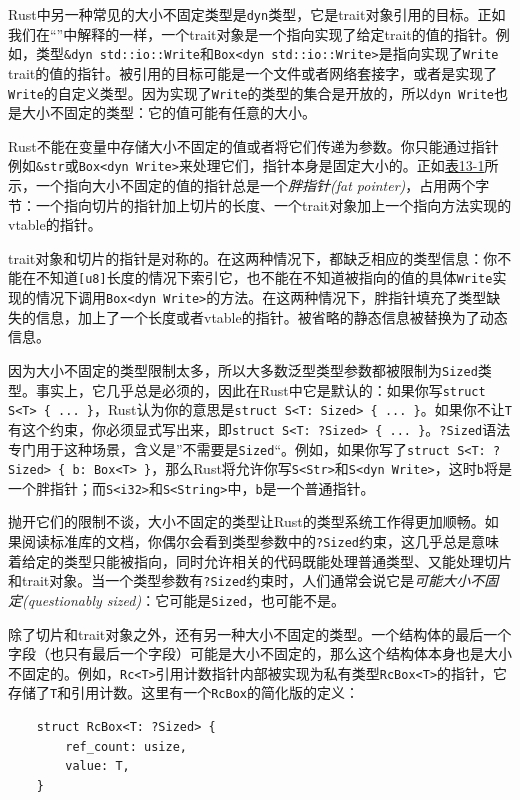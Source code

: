 Rust中另一种常见的大小不固定类型是\texttt{dyn}类型，它是trait对象引用的目标。正如我们在“”中解释的一样，一个trait对象是一个指向实现了给定trait的值的指针。例如，类型\texttt{\&dyn std::io::Write}和\texttt{Box<dyn std::io::Write>}是指向实现了\texttt{Write} trait的值的指针。被引用的目标可能是一个文件或者网络套接字，或者是实现了\texttt{Write}的自定义类型。因为实现了\texttt{Write}的类型的集合是开放的，所以\texttt{dyn Write}也是大小不固定的类型：它的值可能有任意的大小。

Rust不能在变量中存储大小不固定的值或者将它们传递为参数。你只能通过指针例如\texttt{\&str}或\texttt{Box<dyn Write>}来处理它们，指针本身是固定大小的。正如\hyperref[f13-1]{表13-1}所示，一个指向大小不固定的值的指针总是一个\emph{胖指针(fat pointer)}，占用两个字节：一个指向切片的指针加上切片的长度、一个trait对象加上一个指向方法实现的vtable的指针。

trait对象和切片的指针是对称的。在这两种情况下，都缺乏相应的类型信息：你不能在不知道\texttt{[u8]}长度的情况下索引它，也不能在不知道被指向的值的具体\texttt{Write}实现的情况下调用\texttt{Box<dyn Write>}的方法。在这两种情况下，胖指针填充了类型缺失的信息，加上了一个长度或者vtable的指针。被省略的静态信息被替换为了动态信息。

因为大小不固定的类型限制太多，所以大多数泛型类型参数都被限制为\texttt{Sized}类型。事实上，它几乎总是必须的，因此在Rust中它是默认的：如果你写\texttt{struct S<T> \{ ... \}}，Rust认为你的意思是\texttt{struct S<T: Sized> \{ ... \}}。如果你不让\texttt{T}有这个约束，你必须显式写出来，即\texttt{struct S<T: ?Sized> \{ ... \}}。\texttt{?Sized}语法专门用于这种场景，含义是”不需要是\texttt{Sized}“。例如，如果你写了\texttt{struct S<T: ?Sized> \{ b: Box<T> \}}，那么Rust将允许你写\texttt{S<Str>}和\texttt{S<dyn Write>}，这时\texttt{b}将是一个胖指针；而\texttt{S<i32>}和\texttt{S<String>}中，\texttt{b}是一个普通指针。

抛开它们的限制不谈，大小不固定的类型让Rust的类型系统工作得更加顺畅。如果阅读标准库的文档，你偶尔会看到类型参数中的\texttt{?Sized}约束，这几乎总是意味着给定的类型只能被指向，同时允许相关的代码既能处理普通类型、又能处理切片和trait对象。当一个类型参数有\texttt{?Sized}约束时，人们通常会说它是\emph{可能大小不固定(questionably sized)}：它可能是\texttt{Sized}，也可能不是。

除了切片和trait对象之外，还有另一种大小不固定的类型。一个结构体的最后一个字段（也只有最后一个字段）可能是大小不固定的，那么这个结构体本身也是大小不固定的。例如，\texttt{Rc<T>}引用计数指针内部被实现为私有类型\texttt{RcBox<T>}的指针，它存储了\texttt{T}和引用计数。这里有一个\texttt{RcBox}的简化版的定义：
\begin{verbatim}
    struct RcBox<T: ?Sized> {
        ref_count: usize,
        value: T,
    }
\end{verbatim}

